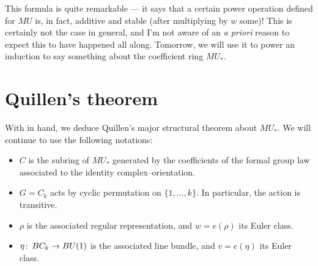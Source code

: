 This formula is quite remarkable --- it says that a certain power operation defined for $MU$ is, in fact, additive and stable (after multiplying by $w$ some)!  This is certainly not the case in general, and I'm not aware of an \textit{a priori} reason to expect this to have happened all along.  Tomorrow, we will use it to power an induction to say something about the coefficient ring $MU_*$.






\section{Quillen's theorem}

With  in hand, we deduce Quillen's major structural theorem about $MU_*$.  We will continue to use the following notations:
\begin{itemize}
\item $C$ is the subring of $MU_*$ generated by the coefficients of the formal group law associated to the identity complex--orientation.
\item $G = C_k$ acts by cyclic permutation on $\{1, \ldots, k\}$.  In particular, the action is transitive.
\item $\rho$ is the associated regular representation, and $w = e(\rho)$ its Euler class.
\item $\eta\colon\thinspace BC_k \to BU(1)$ is the associated line bundle, and $v = e(\eta)$ its Euler class.
\end{itemize}

